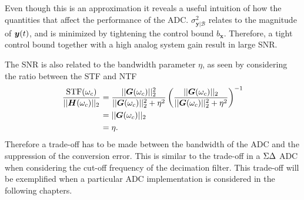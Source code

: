 Even though this is an approximation it reveals a useful intuition of how the quantities that affect the performance of the ADC. $\sigma_{\bm{y}|\mathcal{B}}^2$ relates to the magnitude of $\bm{y}(t)$, and is minimized by tightening the control bound $b_{\bm{x}}$. Therefore, a tight control bound together with a high analog system gain result in large SNR.

The SNR is also related to the bandwidth parameter $\eta$, as seen by considering the ratio between the STF and NTF
\begin{align}
    \frac{\text{STF}(\omega_c)}{||\bm{H}(\omega_c)||_2} &= \frac{||\bm{G}(\omega_c)||_{2}^2}{||\bm{G}(\omega_c)||_{2}^2 + \eta^2 } \left( \frac{||\bm{G}(\omega_c)||_{2}}{||\bm{G}(\omega_c)||_{2}^2 + \eta^2 } \right)^{-1} \\
    & = ||\bm{G}(\omega_c)||_{2} \\ &= \eta.
\end{align}
Therefore a trade-off has to be made between the bandwidth of the ADC and the suppression of the conversion error. This is similar to the trade-off in a $\Sigma\Delta$ ADC when considering the cut-off frequency of the decimation filter. This trade-off will be exemplified when a particular ADC implementation is considered in the following chapters.
